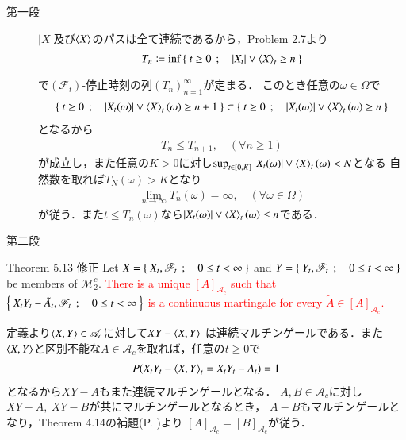 	\begin{prf}\mbox{}
		\begin{description}
			\item[第一段]
				$|X|$及び$\inprod<X>$のパスは全て連続であるから，Problem 2.7より
				\begin{align}
					T_n \coloneqq \inf{}{\Set{t \geq 0}{|X_t| \vee \inprod<X>_t \geq n}}
				\end{align}
				で$(\mathscr{F}_t)$-停止時刻の列$(T_n)_{n=1}^\infty$が定まる．
				このとき任意の$\omega \in \Omega$で
				\begin{align}
					\Set{t \geq 0}{|X_t(\omega)| \vee \inprod<X>_t(\omega) \geq n+1}
					\subset \Set{t \geq 0}{|X_t(\omega)| \vee \inprod<X>_t(\omega) \geq n}
				\end{align}
				となるから
				\begin{align}
					T_n \leq T_{n+1}, \quad (\forall n \geq 1)
				\end{align}
				が成立し，また任意の$K > 0$に対し$\sup{t \in [0,K]}{|X_t(\omega)| \vee \inprod<X>_t(\omega)} < N$となる
				自然数を取れば$T_N(\omega) > K$となり
				\begin{align}
					\lim_{n \to \infty} T_n(\omega) = \infty, \quad (\forall \omega \in \Omega)
				\end{align}
				が従う．また$t \leq T_n(\omega)$なら$|X_t(\omega)| \vee \inprod<X>_t(\omega) \leq n$である．
				
			\item[第二段]
				
		\end{description}
	\end{prf}
	
	\begin{itembox}[l]{Theorem 5.13 修正}
		Let $X = \left\{\ X_t,\mathscr{F}_t\ \, ; \quad 0 \leq t < \infty\ \right\}$ and $Y = \left\{\ Y_t,\mathscr{F}_t\ \, ; \quad 0 \leq t < \infty\ \right\}$
		be members of $\mathscr{M}_2^c$. \textcolor{red}{There is a unique $[A]_{\mathscr{A}_c}$ such that
		$\left\{\ X_t Y_t - \tilde{A}_t,\mathscr{F}_t\ \, ; \quad 0 \leq t < \infty\ \right\}$ is a continuous martingale
		for every $\tilde{A} \in [A]_{\mathscr{A}_c}$.}
	\end{itembox}
	
	\begin{prf}
		定義より$\inprod<X,Y> \in \mathscr{A}_c$に対して$XY - \inprod<X,Y>$
		は連続マルチンゲールである．また$\inprod<X,Y>$と区別不能な$A \in \mathscr{A}_c$を取れば，任意の$t \geq 0$で
		\begin{align}
			P(X_t Y_t - \inprod<X,Y>_t = X_t Y_t - A_t) = 1
		\end{align}
		となるから$XY-A$もまた連続マルチンゲールとなる．
		$A,B \in \mathscr{A}_c$に対し$XY - A,\ XY-B$が共にマルチンゲールとなるとき，
		$A - B$もマルチンゲールとなり，Theorem 4.14の補題(P. \pageref{lem:uniqueness_of_Doob_Meyer_decomposition})より
		$[A]_{\mathscr{A}_c} = [B]_{\mathscr{A}_c}$が従う．
		\QED
	\end{prf}